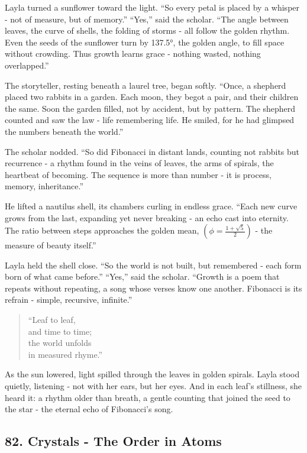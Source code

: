 \documentclass[
  letterpaper,
  DIV=11,
  numbers=noendperiod]{scrreprt}
\begin{document}
Layla turned a sunflower toward the light. ``So every petal is placed by
a whisper - not of measure, but of memory.'' ``Yes,'' said the scholar.
``The angle between leaves, the curve of shells, the folding of storms -
all follow the golden rhythm. Even the seeds of the sunflower turn by
137.5°, the golden angle, to fill space without crowding. Thus growth
learns grace - nothing wasted, nothing overlapped.''

The storyteller, resting beneath a laurel tree, began softly. ``Once, a
shepherd placed two rabbits in a garden. Each moon, they begot a pair,
and their children the same. Soon the garden filled, not by accident,
but by pattern. The shepherd counted and saw the law - life remembering
life. He smiled, for he had glimpsed the numbers beneath the world.''

The scholar nodded. ``So did Fibonacci in distant lands, counting not
rabbits but recurrence - a rhythm found in the veins of leaves, the arms
of spirals, the heartbeat of becoming. The sequence is more than number
- it is process, memory, inheritance.''

He lifted a nautilus shell, its chambers curling in endless grace.
``Each new curve grows from the last, expanding yet never breaking - an
echo cast into eternity. The ratio between steps approaches the golden
mean, \((\phi = \frac{1 + \sqrt{5}}{2})\) - the measure of beauty
itself.''

Layla held the shell close. ``So the world is not built, but remembered
- each form born of what came before.'' ``Yes,'' said the scholar.
``Growth is a poem that repeats without repeating, a song whose verses
know one another. Fibonacci is its refrain - simple, recursive,
infinite.''

\begin{quote}
``Leaf to leaf,\\
and time to time;\\
the world unfolds\\
in measured rhyme.''
\end{quote}

As the sun lowered, light spilled through the leaves in golden spirals.
Layla stood quietly, listening - not with her ears, but her eyes. And in
each leaf's stillness, she heard it: a rhythm older than breath, a
gentle counting that joined the seed to the star - the eternal echo of
Fibonacci's song.

\subsection{82. Crystals - The Order in
Atoms}\label{crystals---the-order-in-atoms}
\end{document}
